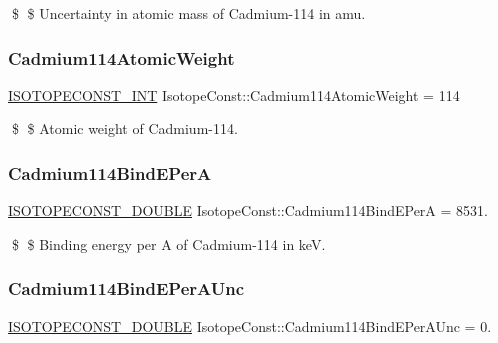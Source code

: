 \$ \$ Uncertainty in atomic mass of Cadmium-\/114 in amu. \mbox{\label{group___isotope_const-_cadmium-_cd114_ga52f0160d4be26c3f2ab31dce613cdc46}} 
\subsubsection{\texorpdfstring{Cadmium114\+Atomic\+Weight}{Cadmium114AtomicWeight}}
{\footnotesize\ttfamily \mbox{\hyperlink{group___isotope_const-_macros_ga5f18360b3e99483a35c32d789e62621c}{I\+S\+O\+T\+O\+P\+E\+C\+O\+N\+S\+T\+\_\+\+I\+NT}} Isotope\+Const\+::\+Cadmium114\+Atomic\+Weight = 114}

\$ \$ Atomic weight of Cadmium-\/114. \mbox{\label{group___isotope_const-_cadmium-_cd114_ga0bca92afd849cfb5fe0bce8e0cd3ad02}} 
\subsubsection{\texorpdfstring{Cadmium114\+Bind\+E\+PerA}{Cadmium114BindEPerA}}
{\footnotesize\ttfamily \mbox{\hyperlink{group___isotope_const-_macros_ga8f45a7272ce02c0b4c65c44636ed719a}{I\+S\+O\+T\+O\+P\+E\+C\+O\+N\+S\+T\+\_\+\+D\+O\+U\+B\+LE}} Isotope\+Const\+::\+Cadmium114\+Bind\+E\+PerA = 8531.}

\$ \$ Binding energy per A of Cadmium-\/114 in keV. \mbox{\label{group___isotope_const-_cadmium-_cd114_ga6d4347b7f2bab5924d1880fdbde9ef1b}} 
\subsubsection{\texorpdfstring{Cadmium114\+Bind\+E\+Per\+A\+Unc}{Cadmium114BindEPerAUnc}}
{\footnotesize\ttfamily \mbox{\hyperlink{group___isotope_const-_macros_ga8f45a7272ce02c0b4c65c44636ed719a}{I\+S\+O\+T\+O\+P\+E\+C\+O\+N\+S\+T\+\_\+\+D\+O\+U\+B\+LE}} Isotope\+Const\+::\+Cadmium114\+Bind\+E\+Per\+A\+Unc = 0.}

